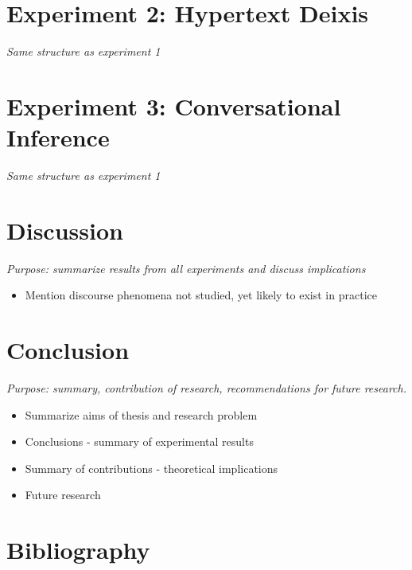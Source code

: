 \section{Experiment 2: Hypertext Deixis}
\label{experiment2:hypertextdeixis}

\emph{Same structure as experiment 1}

\section{Experiment 3: Conversational Inference}
\label{experiment3:conversationalinference}

\emph{Same structure as experiment 1}

\section{Discussion}
\label{discussion}

\emph{Purpose: summarize results from all experiments and discuss implications}

\begin{itemize}
\item Mention discourse phenomena not studied, yet likely to exist in practice

\end{itemize}

\section{Conclusion}
\label{conclusion}

\emph{Purpose: summary, contribution of research, recommendations for future research.}

\begin{itemize}
\item Summarize aims of thesis and research problem

\item Conclusions - summary of experimental results

\item Summary of contributions - theoretical implications

\item Future research

\end{itemize}

\section{Bibliography}
\label{bibliography}


